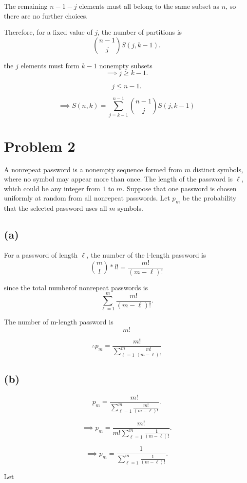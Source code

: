 \documentclass{article}
\begin{document}
The remaining $n-1-j$ elements must all belong to the same subset as $n$,
so there are no further choices.

Therefore, for a fixed value of $j$, the number of partitions is
\[
\binom{n-1}{j}S(j,k-1).
\]

the $j$ elements must form $k-1$ nonempty subsets
\[
\implies
j \geq k-1.
\]

\[
j \leq n-1.
\]

\[
\implies
S(n,k)=
\sum_{j=k-1}^{n-1}
\binom{n-1}{j}S(j,k-1)
\]





\section*{Problem 2}

A nonrepeat password is a nonempty sequence formed from $m$ distinct symbols,
where no symbol may appear more than once. The length of the password is $\ell$,
which could be any integer from $1$ to $m$. Suppose that one password is chosen
uniformly at random from all nonrepeat passwords. Let $p_m$ be the probability
that the selected password uses all $m$ symbols.

\subsection*{(a)}

For a password of length $\ell$, the number of the l-length password is
\[
\binom{m}{l}*l!=\frac{m!}{(m-\ell)!}
\]

since the total numberof nonrepeat passwords is
\[
\sum_{\ell=1}^{m}
\frac{m!}{(m-\ell)!}.
\]

The number of m-length password is
\[
m!
\]

\[
\therefore
p_m
=
\frac{m!}
{\displaystyle\sum_{\ell=1}^{m}\frac{m!}{(m-\ell)!}}
\]

\subsection*{(b)}

\[
p_m
=
\frac{m!}
{\displaystyle\sum_{\ell=1}^{m}\frac{m!}{(m-\ell)!}}.
\]


\[
\implies
p_m
=
\frac{m!}
{m!\displaystyle\sum_{\ell=1}^{m}
\frac{1}{(m-\ell)!}}.
\]

\[
\implies
p_m
=
\frac{1}
{\displaystyle\sum_{\ell=1}^{m}
\frac{1}{(m-\ell)!}}.
\]

Let
\end{document}
